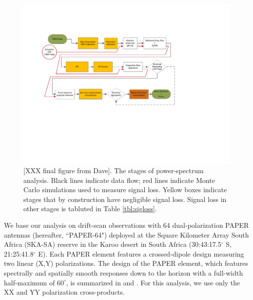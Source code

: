 \documentclass[twocolumn,numberedappendix]{emulateapj} \shorttitle{PSA64}
\begin{document}
\begin{figure}
\includegraphics[width=2\columnwidth,trim=0cm 7cm 5cm 2cm,clip]{plots/data_flow_chart.pdf}
\caption
{
[XXX final figure from Dave].
The stages of power-spectrum analysis. Black lines indicate data flow; red lines indicate
Monte Carlo simulations used to 
measure signal loss. Yellow boxes indicate stages that by construction have negligible signal loss.
Signal loss in other stages is tabluted in Table \ref{tbl:sigloss}.
}
\label{fig:flowchart}
\end{figure}

We base our analysis on drift-scan observations 
with 64 dual-polarization PAPER antennas (hereafter, ``PAPER-64") deployed 
at the Square Kilometer Array South Africa
(SKA-SA) reserve in the Karoo desert in South Africa
(30:43:17.5$^\circ$ S, 21:25:41.8$^\circ$ E).
Each PAPER element features a crossed-dipole design measuring two
linear (X,Y) polarizations.
The design of the PAPER element, 
which features spectrally and spatially smooth responses 
down to the horizon with a full-width half-maximum of $60^{\circ}$, is summarized in \citet{parsons_et_al2010}
and \citet{pober_et_al2012}.  
For this analysis, we use only the XX and YY polarization cross-products.
\end{document}
